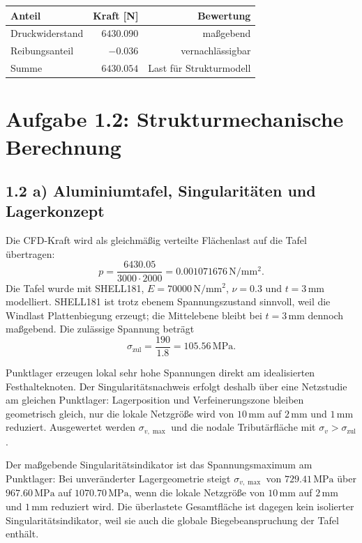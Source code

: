 \documentclass[10pt,a4paper]{article}
\begin{document}
\begin{table}[H]\centering\small
\begin{tabular}{lrr}
\toprule
Anteil & Kraft [N] & Bewertung\\
\midrule
Druckwiderstand & \(6430.090\) & maßgebend\\
Reibungsanteil & \(-0.036\) & vernachlässigbar\\
Summe & \(6430.054\) & Last für Strukturmodell\\
\bottomrule
\end{tabular}
\end{table}

\section{Aufgabe 1.2: Strukturmechanische Berechnung}

\subsection*{1.2 a) Aluminiumtafel, Singularitäten und Lagerkonzept}
Die CFD-Kraft wird als gleichmäßig verteilte Flächenlast auf die Tafel übertragen:
\[
p=\frac{6430.05}{3000\cdot2000}=0.001071676\,\mathrm{N/mm^2}.
\]
Die Tafel wurde mit SHELL181, \(E=70000\,\mathrm{N/mm^2}\), \(\nu=0.3\) und \(t=3\,\mathrm{mm}\) modelliert. SHELL181 ist trotz ebenem Spannungszustand sinnvoll, weil die Windlast Plattenbiegung erzeugt; die Mittelebene bleibt bei \(t=3\,\mathrm{mm}\) dennoch maßgebend. Die zulässige Spannung beträgt
\[
\sigma_\mathrm{zul}=\frac{190}{1.8}=105.56\,\mathrm{MPa}.
\]

Punktlager erzeugen lokal sehr hohe Spannungen direkt am idealisierten Festhalteknoten. Der Singularitätsnachweis erfolgt deshalb über eine Netzstudie am gleichen Punktlager: Lagerposition und Verfeinerungszone bleiben geometrisch gleich, nur die lokale Netzgröße wird von \(10\,\mathrm{mm}\) auf \(2\,\mathrm{mm}\) und \(1\,\mathrm{mm}\) reduziert. Ausgewertet werden \(\sigma_{v,\max}\) und die nodale Tributärfläche mit \(\sigma_v>\sigma_\mathrm{zul}\).

\begin{table}[H]\centering\small

\caption{Netzstudie für die Punktlager. Die Zeilen werden nach dem MAPDL-Solverlauf automatisch mit Spannungsmaximum und überlasteter Fläche gefüllt.}
\end{table}

Der maßgebende Singularitätsindikator ist das Spannungsmaximum am Punktlager: Bei unveränderter Lagergeometrie steigt \(\sigma_{v,\max}\) von \(729.41\,\mathrm{MPa}\) über \(967.60\,\mathrm{MPa}\) auf \(1070.70\,\mathrm{MPa}\), wenn die lokale Netzgröße von \(10\,\mathrm{mm}\) auf \(2\,\mathrm{mm}\) und \(1\,\mathrm{mm}\) reduziert wird. Die überlastete Gesamtfläche ist dagegen kein isolierter Singularitätsindikator, weil sie auch die globale Biegebeanspruchung der Tafel enthält.
\end{document}
